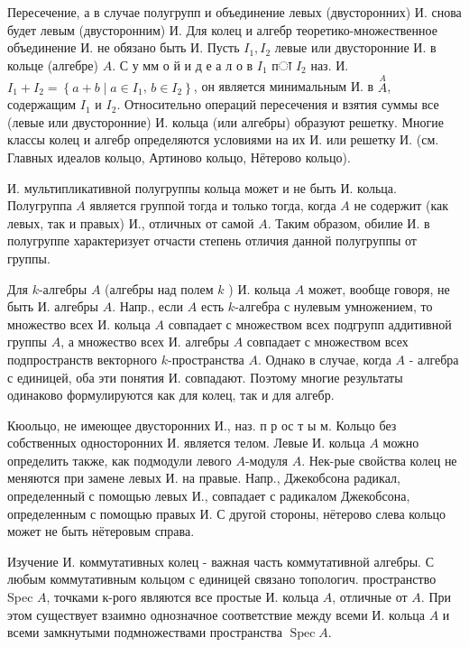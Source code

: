\documentclass[10pt]{article}
\begin{document}
Пересечение, а в случае полугрупп и объединение левых (двусторонних) И. снова будет левым (двусторонним) И. Для колец и алгебр теоретико-множественное объединение И. не обязано быть И. Пусть $I_{1}, I_{2}$ левые или двусторонние И. в кольце (алгебре) $A$. С у мм о й и д е а л о в $I_{1}$ пा $I_{2}$ наз. И. $I_{1}+I_{2}=\left\{a+b \mid a \in I_{1}\right.$, $\left.b \in I_{2}\right\}$, он является минимальным И. в $\stackrel{A}{A}$, содержащим $I_{1}$ и $I_{2}$. Относительно операций пересечения и взятия суммы все (левые или двусторонние) И. кольца (или алгебры) образуют решетку. Многие классы колец и алгебр определяются условиями на их И. или решетку И. (см. Главных идеалов кольцо, Артиново кольцо, Нётерово кольцо).



И. мультипликативной полугруппы кольца может и не быть И. кольца. Полугруппа $A$ является группой тогда и только тогда, когда $A$ не содержит (как левых, так и правых) И., отличных от самой $A$. Таким образом, обилие И. в полугруппе характеризует отчасти степень отличия данной полугруппы от группы.



Для $k$-алгебры $A$ (алгебры над полем $k$ ) И. кольца $A$ может, вообще говоря, не быть И. алгебры $A$. Напр., если $A$ есть $k$-алгебра с нулевым умножением, то множество всех И. кольца $A$ совпадает с множеством всех подгрупп аддитивной группы $A$, а множество всех И. алгебры $A$ совпадает с множеством всех подпространств векторного $k$-пространства $A$. Однако в случае, когда $A$ - алгебра с единицей, оба эти понятия И. совпадают. Поэтому многие результаты одинаково формулируются как для колец, так и для алгебр.



Кюольцо, не имеющее двусторонних И., наз. п р ос т ы м. Кольцо без собственных односторонних И. является телом. Левые И. кольца $A$ можно определить также, как подмодули левого $A$-модуля $A$. Нек-рые свойства колец не меняются при замене левых И. на правые. Напр., Джекобсона радикал, определенный с помощью левых И., совпадает с радикалом Джекобсона, определенным с помощью правых И. С другой стороны, нётерово слева кольцо может не быть нётеровым справа.



Изучение И. коммутативных колец - важная часть коммутативной алгебры. С любым коммутативным кольцом с единицей связано топологич. пространство Spec $A$, точками к-рого являются все простые И. кольца $A$, отличные от $A$. При этом существует взаимно однозначное соответствие между всеми И. кольца $A$ и всеми замкнутыми подмножествами пространства $\operatorname{Spec} A$.
\end{document}
